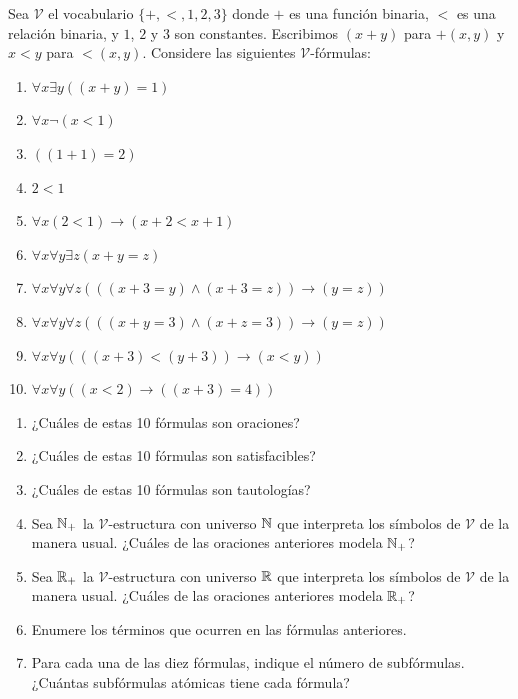 \documentclass[12pt,a4paper]{book}
\newcommand{\VV}{\mathcal{V}}
\begin{document}
    \begin{ejercicio}\label{ej:vocab-aritmetico-varios}
        Sea $\VV$ el vocabulario $\{+,<,1,2,3\}$ donde $+$ es una función binaria, $<$ es una relación binaria, y $1$, $2$
        y $3$ son constantes. Escribimos $(x+y)$ para $+(x,y)$ y $x<y$ para $<(x,y)$. Considere las siguientes
        $\VV$-fórmulas:
        \begin{enumerate}
            \item[1.] $\forall x\exists y((x+y)=1)$
            \item[2.] $\forall x\neg(x<1)$
            \item[3.] $((1+1)=2)$
            \item[4.] $2<1$
            \item[5.] $\forall x(2<1)\rightarrow(x+2<x+1)$
            \item[6.] $\forall x\forall y\exists z(x+y=z)$
            \item[7.] $\forall x\forall y\forall z(((x+3=y)\wedge(x+3=z))\rightarrow(y=z))$
            \item[8.] $\forall x\forall y\forall z(((x+y=3)\wedge(x+z=3))\rightarrow(y=z))$
            \item[9.] $\forall x\forall y(((x+3)<(y+3))\rightarrow(x<y))$
            \item[10.] $\forall x\forall y((x<2)\rightarrow((x+3)=4))$
        \end{enumerate}
        \begin{enumerate}[label=(\alph*)]
            \item ¿Cuáles de estas 10 fórmulas son oraciones?
            \item ¿Cuáles de estas 10 fórmulas son satisfacibles?
            \item ¿Cuáles de estas 10 fórmulas son tautologías?
            \item Sea $\mathbb{N}_{+}$ la $\VV$-estructura con universo $\mathbb{N}$ que interpreta los símbolos de $\VV$ de la manera
            usual. ¿Cuáles de las oraciones anteriores modela $\mathbb{N}_{+}$?
            \item Sea $\mathbb{R}_{+}$ la $\VV$-estructura con universo $\mathbb{R}$ que interpreta los símbolos de $\VV$ de la manera
            usual. ¿Cuáles de las oraciones anteriores modela $\mathbb{R}_{+}$?
            \item Enumere los términos que ocurren en las fórmulas anteriores.
            \item Para cada una de las diez fórmulas, indique el número de subfórmulas. ¿Cuántas subfórmulas atómicas
            tiene cada fórmula?
        \end{enumerate}
    \end{ejercicio}
\end{document}
